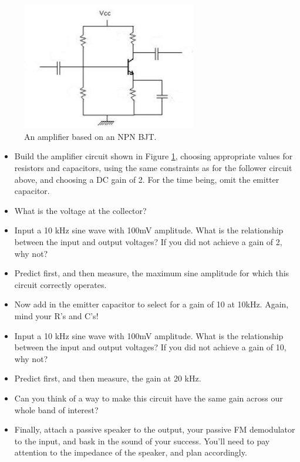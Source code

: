 \documentclass[11pt]{article}
\begin{document}
\begin{figure}[h!]\centering
\includegraphics[width=3in]{plots/bjt_amplifier_lab2.png}
\caption{An amplifier based on an NPN BJT.}
\label{fig:amplifier}
\end{figure}

\begin{itemize}[noitemsep,nolistsep]
\item Build the amplifier circuit shown in Figure \ref{fig:amplifier}, choosing appropriate values for
resistors and capacitors, using the same constraints as for the follower circuit above, and choosing a
DC gain of 2.  For the time being, omit the emitter capacitor.
\item What is the voltage at the collector?
\item Input a 10 kHz sine wave with 100mV amplitude.  What is the relationship between the 
input and output voltages?  If you did not achieve a gain of 2, why not?
\item Predict first, and then measure, the maximum sine amplitude for which this circuit correctly operates.
\item Now add in the emitter capacitor to select for a gain of 10 at 10kHz.  Again, mind your R's and C's!
\item Input a 10 kHz sine wave with 100mV amplitude.  What is the relationship between the 
input and output voltages?  If you did not achieve a gain of 10, why not?
\item Predict first, and then measure, the gain at 20 kHz.
\item Can you think of a way to make this circuit have the same gain across our whole band of interest?
\item Finally, attach a passive speaker to the output, your passive FM demodulator to the input, and bask in
the sound of your success.  You'll need to pay attention to the impedance of the speaker, and plan accordingly.
\end{itemize}
\end{document}
